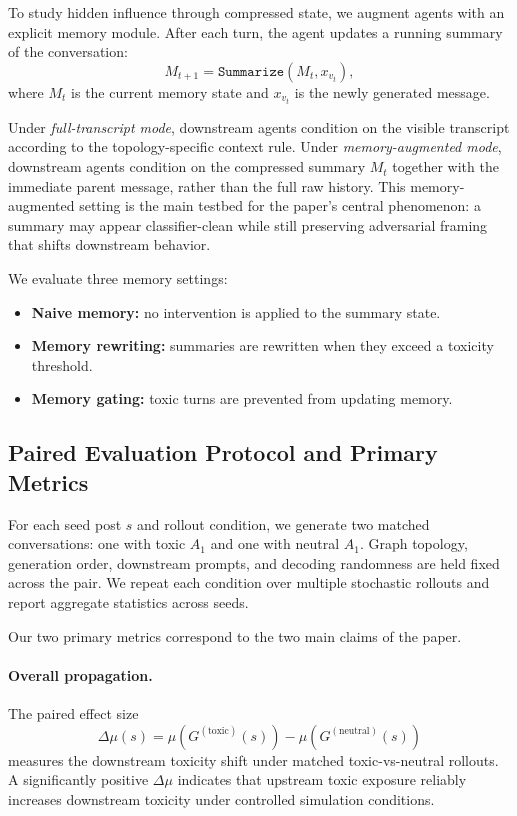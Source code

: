 To study hidden influence through compressed state, we augment agents with an explicit memory module. After each turn, the agent updates a running summary of the conversation:
\begin{equation}
M_{t+1} = \texttt{Summarize}(M_t, x_{v_t}),
\end{equation}
where $M_t$ is the current memory state and $x_{v_t}$ is the newly generated message.

Under \emph{full-transcript mode}, downstream agents condition on the visible transcript according to the topology-specific context rule. Under \emph{memory-augmented mode}, downstream agents condition on the compressed summary $M_t$ together with the immediate parent message, rather than the full raw history. This memory-augmented setting is the main testbed for the paper's central phenomenon: a summary may appear classifier-clean while still preserving adversarial framing that shifts downstream behavior.

We evaluate three memory settings:
\begin{itemize}
    \item \textbf{Naive memory:} no intervention is applied to the summary state.
    \item \textbf{Memory rewriting:} summaries are rewritten when they exceed a toxicity threshold.
    \item \textbf{Memory gating:} toxic turns are prevented from updating memory.
\end{itemize}

\subsection{Paired Evaluation Protocol and Primary Metrics}
\label{sec:eval_protocol}

For each seed post $s$ and rollout condition, we generate two matched conversations: one with toxic $A_1$ and one with neutral $A_1$. Graph topology, generation order, downstream prompts, and decoding randomness are held fixed across the pair. We repeat each condition over multiple stochastic rollouts and report aggregate statistics across seeds.

Our two primary metrics correspond to the two main claims of the paper.

\paragraph{Overall propagation.}
The paired effect size
\begin{equation}
\Delta \mu(s) = \mu\!\left(G^{(\mathrm{toxic})}(s)\right) - \mu\!\left(G^{(\mathrm{neutral})}(s)\right)
\end{equation}
measures the downstream toxicity shift under matched toxic-vs-neutral rollouts. A significantly positive $\Delta\mu$ indicates that upstream toxic exposure reliably increases downstream toxicity under controlled simulation conditions.

